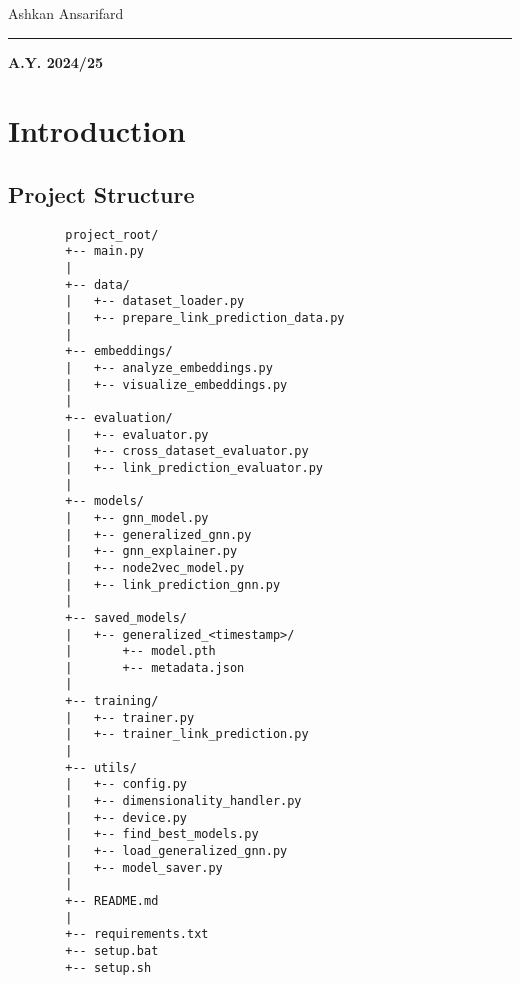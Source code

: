 	\vspace{0.5cm} 

	\begin{center}
	{\fontsize{20}{25}\selectfont Ashkan Ansarifard}
	\end{center}
	\vspace{0.5cm} 

	\begin{center}
		{\fontsize{20}{25}}
	\end{center}

	\vspace{1cm} 

	\textcolor{blue!60!black}{\rule{\linewidth}{2pt}}
	
	\vspace{8cm} 
	
	\begin{center}
	\textbf{A.Y. 2024/25}
	\end{center}

	\thispagestyle{empty}
	
	\newpage
	
	\myTOC

	\newpage
	\section{Introduction}\label{sec:intro}
	\subsection{Project Structure}\label{sec:proj-strut}
	\begin{lstlisting}
		project_root/
		+-- main.py
		|
		+-- data/
		|   +-- dataset_loader.py
		|   +-- prepare_link_prediction_data.py
		|
		+-- embeddings/
		|   +-- analyze_embeddings.py
		|   +-- visualize_embeddings.py
		|
		+-- evaluation/
		|   +-- evaluator.py
		|   +-- cross_dataset_evaluator.py
		|   +-- link_prediction_evaluator.py
		|
		+-- models/
		|   +-- gnn_model.py
		|   +-- generalized_gnn.py
		|   +-- gnn_explainer.py
		|   +-- node2vec_model.py
		|   +-- link_prediction_gnn.py
		|
		+-- saved_models/
		|   +-- generalized_<timestamp>/
		|       +-- model.pth
		|       +-- metadata.json
		|
		+-- training/
		|   +-- trainer.py
		|   +-- trainer_link_prediction.py
		|
		+-- utils/
		|   +-- config.py
		|   +-- dimensionality_handler.py
		|   +-- device.py
		|   +-- find_best_models.py
		|   +-- load_generalized_gnn.py
		|   +-- model_saver.py
		|
		+-- README.md
		|
		+-- requirements.txt
		+-- setup.bat
		+-- setup.sh
	\end{lstlisting}
	
